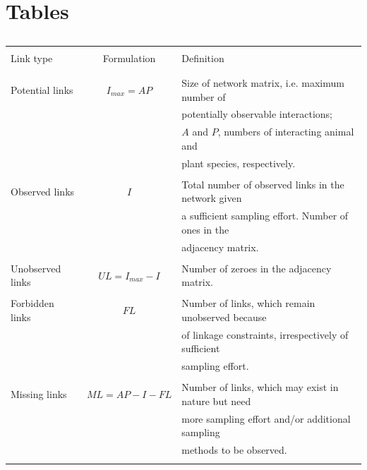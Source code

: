 \documentclass[12pt]{article}
\begin{document}
\section*{Tables}
\begin{table}[ht!]
  \caption{}
  \label{Table_1}
  \begin{center}
		\begin{tabular}{lcl}
      \hline
\\Link type   &  Formulation   &   Definition\\\\
      \hline
\\Potential links&$I_{max}= AP$&Size of network matrix, i.e. maximum number of \\ && potentially observable interactions;  \\ && $A$ and $P$, numbers of interacting animal and \\ &&  plant species, respectively.\\\\
Observed links&$I$&Total number of observed links in the network given \\ &&  a sufficient sampling effort. Number of ones in the  \\ && adjacency matrix.\\\\
Unobserved links&$UL= I_{max} - I$&Number of zeroes in the adjacency matrix.\\\\
Forbidden links&$FL$&Number of links, which remain unobserved because  \\ && of linkage constraints, irrespectively of sufficient  \\ && sampling effort.\\\\
Missing links&$ML= AP - I - FL$&Number of links, which may exist in nature but need  \\ && more sampling effort and\slash or additional sampling  \\ && methods to be observed.\\\\
      \hline
		\end{tabular}
 	\end{center}
\end{table}
%
\newpage
\end{document}
